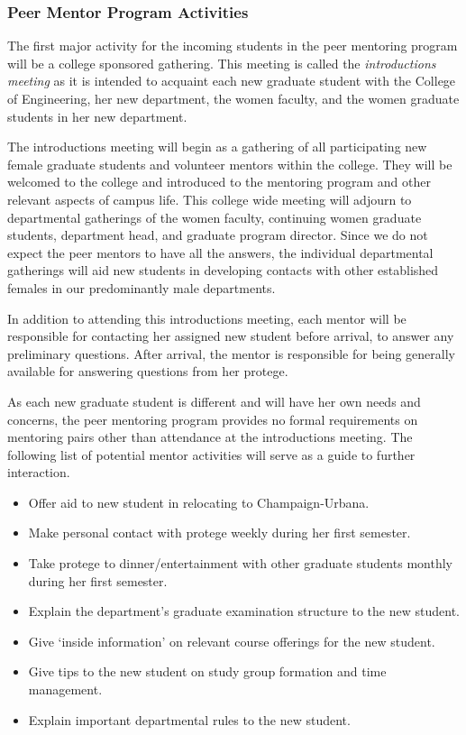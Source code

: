 \subsubsection{Peer Mentor Program Activities}
\label{activities}







The first major activity for the incoming students in the 
peer mentoring program will
be a college sponsored gathering.
This meeting is called the {\em introductions meeting} as it is
intended to acquaint each new graduate student with the College of 
Engineering, her new department, the women faculty,
and the women graduate students in her new department.  

The introductions meeting will begin as a gathering of all
participating new female graduate students and volunteer mentors 
within the college.
They will be welcomed to the college and  
introduced to the mentoring program and other relevant
aspects of campus life.   
This college wide meeting will
adjourn to departmental gatherings of the women faculty,
continuing women graduate students, department head, and
graduate program director. 
Since we do not expect the peer mentors to have all
the answers, the individual departmental gatherings will
aid new students in developing contacts with other
established females in our predominantly male departments.

In addition to attending this introductions meeting,
each mentor will be responsible for contacting her assigned
new student before arrival, to answer any preliminary questions.
After arrival, the mentor is responsible for being generally available
for answering questions from her protege.

As each new graduate student is different and will have her own
needs and concerns, the peer mentoring program provides no
formal requirements on mentoring pairs other than attendance 
at the introductions meeting.
The following list of potential mentor activities will serve as 
a guide to further interaction.

\begin{itemize}
\item{Offer aid to new student in relocating to Champaign-Urbana.}
\item{Make personal contact with protege weekly during her first 
semester.}
\item{Take protege to dinner/entertainment with other graduate students 
monthly during her first semester.}
\item Explain the department's graduate examination structure to the
new student.
\item Give `inside information' on relevant course offerings for
the new student.
\item Give tips to the new student on study group formation
and time management.
\item Explain important departmental rules to the new student.
\end{itemize}

